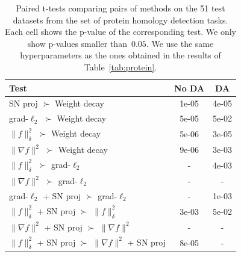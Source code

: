 \begin{table}
\caption{Paired t-tests comparing pairs of methods on the 51 test datasets from the
set of protein homology detection tasks.
Each cell shows the p-value of the corresponding test.
We only show p-values smaller than~$0.05$.
We use the same hyperparameters as the ones obtained in the results of Table~\ref{tab:protein}.
}
\centering
\vspace{0.2cm}
\label{tab:protein_ttests}
\begin{tabular}{|l|c|c|}
\hline
 Test                                                            &   No DA &      DA \\ \hline
\hline
 SN proj $\succ$ Weight decay                                    &   1e-05 &   4e-05 \\
 grad-$\ell_2$ $\succ$ Weight decay                              &   5e-05 &   5e-02 \\
 $\|f\|_{\delta}^2$ $\succ$ Weight decay                         &   5e-06 &   3e-05 \\
 $\|\nabla f\|^2$ $\succ$ Weight decay                           &   9e-06 &   3e-03 \\
 $\|f\|_{\delta}^2$ $\succ$ grad-$\ell_2$                        &   -     &   4e-03 \\
 $\|\nabla f\|^2$ $\succ$ grad-$\ell_2$                          &   -     &   -     \\
 grad-$\ell_2$ + SN proj $\succ$ grad-$\ell_2$                   &   -     &   1e-03 \\
 $\|f\|_{\delta}^2$ + SN proj $\succ$ $\|f\|_{\delta}^2$         &   3e-03 &   5e-02 \\
 $\|\nabla f\|^2$ + SN proj $\succ$ $\|\nabla f\|^2$             &   -     &   -     \\
 $\|f\|_{\delta}^2$ + SN proj $\succ$ $\|\nabla f\|^2$ + SN proj &   8e-05 &   -     \\
\hline
\end{tabular}
\end{table}

